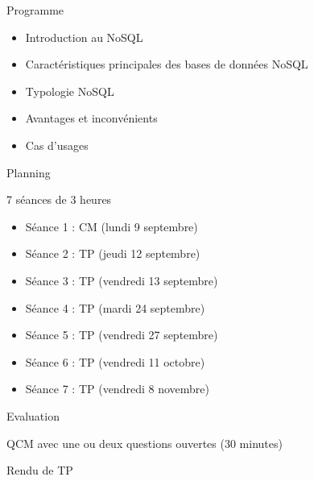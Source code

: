 \begin{frame}{Programme}

\begin{itemize}
    \item Introduction au NoSQL
    \item Caractéristiques principales des bases de données NoSQL
    \item Typologie NoSQL
    \item Avantages et inconvénients
    \item Cas d'usages
\end{itemize}

\end{frame}


\begin{frame}{Planning}
    
    7 séances de 3 heures\\

    \begin{itemize}
        \item Séance 1 : CM (lundi 9 septembre)
        \item Séance 2 : TP (jeudi 12 septembre)
        \item Séance 3 : TP (vendredi 13 septembre)
        \item Séance 4 : TP (mardi 24 septembre)
        \item Séance 5 : TP (vendredi 27 septembre)
        \item Séance 6 : TP (vendredi 11 octobre)
        \item Séance 7 : TP (vendredi 8 novembre)

    \end{itemize}
\end{frame}

\begin{frame}{Evaluation}
    
QCM avec une ou deux questions ouvertes (30 minutes)

Rendu de TP

\end{frame}


